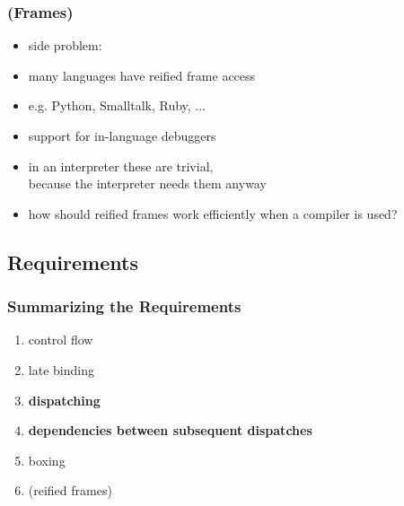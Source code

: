 \documentclass[utf8x]{beamer}
\begin{document}
\begin{frame}
  \frametitle{(Frames)}
  \begin{itemize}
      \item side problem:
      \item many languages have reified frame access
      \item e.g. Python, Smalltalk, Ruby, ...
      \item support for in-language debuggers
      \item in an interpreter these are trivial,\\
      because the interpreter needs them anyway
      \item how should reified frames work efficiently when a compiler is used?
  \end{itemize}
\end{frame}


\subsection{Requirements}

\begin{frame}
  \frametitle{Summarizing the Requirements}
  \begin{enumerate}
      \item control flow
      \item late binding
      \item \textbf{dispatching}
      \item \textbf{dependencies between subsequent dispatches}
      \item boxing
      \item (reified frames)
  \end{enumerate}
\end{frame}
\end{document}
